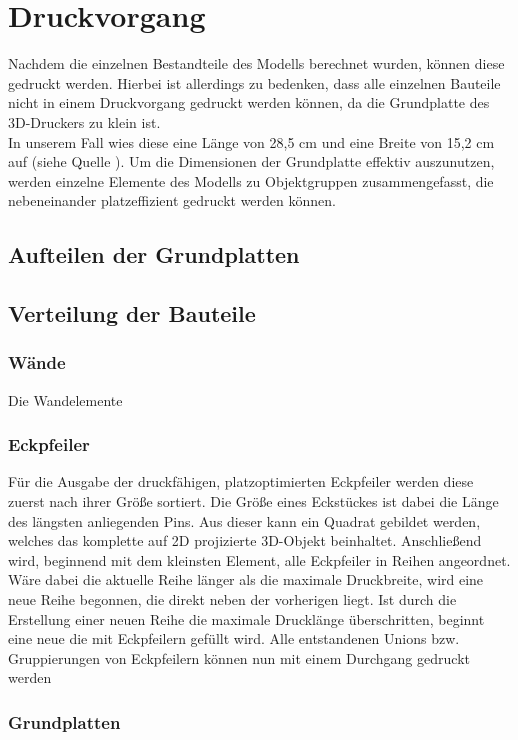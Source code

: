 \section{Druckvorgang}
Nachdem die einzelnen Bestandteile des Modells berechnet wurden, können diese gedruckt werden.
Hierbei ist allerdings zu bedenken, dass alle einzelnen Bauteile nicht in einem Druckvorgang gedruckt werden können, da die Grundplatte des 3D-Druckers zu klein ist. \\
In unserem Fall wies diese eine Länge von 28,5 cm und eine Breite von 15,2 cm auf (siehe Quelle \cite{makerbotspecs}).
Um die Dimensionen der Grundplatte effektiv auszunutzen, werden einzelne Elemente des Modells zu Objektgruppen zusammengefasst, die nebeneinander platzeffizient gedruckt werden können.

\subsection{Aufteilen der Grundplatten}

\subsection{Verteilung der Bauteile}
\subsubsection{Wände}
Die Wandelemente
\subsubsection{Eckpfeiler}
Für die Ausgabe der druckfähigen, platzoptimierten Eckpfeiler werden diese zuerst nach ihrer Größe sortiert.
Die Größe eines Eckstückes ist dabei die Länge des längsten anliegenden Pins.
Aus dieser kann ein Quadrat gebildet werden, welches das komplette auf 2D projizierte 3D-Objekt beinhaltet.
Anschließend wird, beginnend mit dem kleinsten Element, alle Eckpfeiler in Reihen angeordnet. 
Wäre dabei die aktuelle Reihe länger als die maximale Druckbreite, wird eine neue Reihe begonnen, die direkt neben der vorherigen liegt.
Ist durch die Erstellung einer neuen Reihe die maximale Drucklänge überschritten, beginnt eine neue  die mit Eckpfeilern gefüllt wird.
Alle entstandenen Unions bzw. Gruppierungen von Eckpfeilern können nun mit einem Durchgang gedruckt werden  
\subsubsection{Grundplatten}
